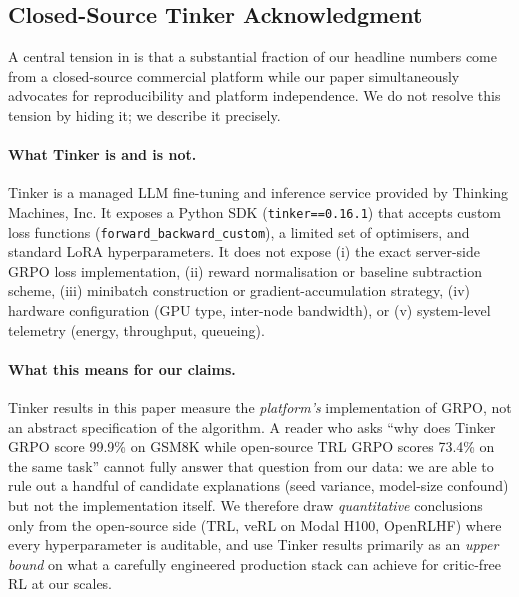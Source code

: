 \subsection{Closed-Source Tinker Acknowledgment}
\label{sec:tinker_closed}

A central tension in \ours{} is that a substantial fraction of our
headline numbers come from a closed-source commercial platform while our
paper simultaneously advocates for reproducibility and platform
independence. We do not resolve this tension by hiding it; we describe
it precisely.

\paragraph{What Tinker is and is not.}
Tinker \cite{thinkingmachines2024tinker} is a managed LLM fine-tuning and
inference service provided by Thinking Machines, Inc. It exposes a Python
SDK (\texttt{tinker==0.16.1}) that accepts custom loss functions
(\texttt{forward\_backward\_custom}), a limited set of optimisers, and
standard LoRA hyperparameters. It does not expose (i) the exact server-side
GRPO loss implementation, (ii) reward normalisation or baseline subtraction
scheme, (iii) minibatch construction or gradient-accumulation strategy,
(iv) hardware configuration (GPU type, inter-node bandwidth), or (v)
system-level telemetry (energy, throughput, queueing).

\paragraph{What this means for our claims.}
Tinker results in this paper measure the \emph{platform's} implementation
of GRPO, not an abstract specification of the algorithm. A reader who asks
``why does Tinker GRPO score 99.9\% on GSM8K while open-source TRL GRPO
scores 73.4\% on the same task'' cannot fully answer that question from
our data: we are able to rule out a handful of candidate explanations
(seed variance, model-size confound) but not the implementation itself.
We therefore draw \emph{quantitative} conclusions only from the
open-source side (TRL, veRL on Modal H100, OpenRLHF) where every
hyperparameter is auditable, and use Tinker results primarily as an
\emph{upper bound} on what a carefully engineered production stack can
achieve for critic-free RL at our scales.

